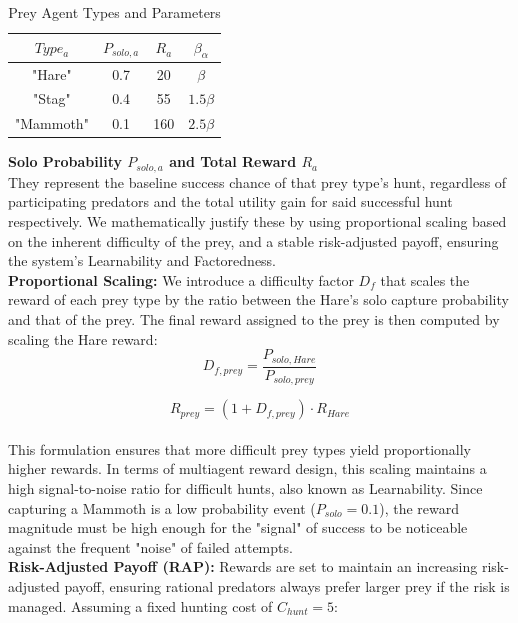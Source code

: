 \documentclass[12pt,a4paper]{report}
\begin{document}
	\begin{table}[H]
		\centering
		\begin{tabular}{|c|c|c|c|}
			\hline
			$Type_{a}$ & $P_{solo,a}$ & $R_{a}$ & $β_{α}$ \\
			\hline
			"Hare" & 0.7 & 20 & $β$\\
			"Stag" & 0.4 & 55 & $1.5β$\\
			"Mammoth" & 0.1 & 160 & $2.5β$ \\
			\hline
		\end{tabular}
		\caption{Prey Agent Types and Parameters}
	\end{table}
	
	\textbf{Solo Probability $P_{solo,a}$ and Total Reward $R_{a}$} \\
	
	They represent the baseline success chance of that prey type's hunt, regardless of participating predators and the total utility gain for said successful hunt respectively. We mathematically justify these by using proportional scaling based on the inherent difficulty of the prey, and a stable risk-adjusted payoff, ensuring the system's Learnability and Factoredness. \cite{Agogino2008} \\
	
	\textbf{Proportional Scaling:} We introduce a difficulty factor $D_{f}$ that scales the reward of each prey type by the ratio between the Hare's solo capture probability and that of the prey. The final reward assigned to the prey is then computed by scaling the Hare reward: \\
	
	\[	D_{f,prey} = \frac{P_{solo, Hare}}{P_{solo, prey}}	\]
	
	\[ R_{prey} = (1 + D_{f,prey}) \cdot R_{Hare} \] \\
	
	This formulation ensures that more difficult prey types yield proportionally higher rewards. In terms of multiagent reward design, this scaling maintains a high signal-to-noise ratio for difficult hunts, also known as Learnability. \cite{Agogino2008} Since capturing a Mammoth is a low probability event ($P_{solo} = 0.1$), the reward magnitude must be high enough for the "signal" of success to be noticeable against the frequent "noise" of failed attempts. \\
	
	\textbf{Risk-Adjusted Payoff (RAP):} Rewards are set to maintain an increasing risk-adjusted payoff, ensuring rational predators always prefer larger prey if the risk is managed. Assuming a fixed hunting cost of $C_{hunt} = 5$: \\
	
\end{document}
